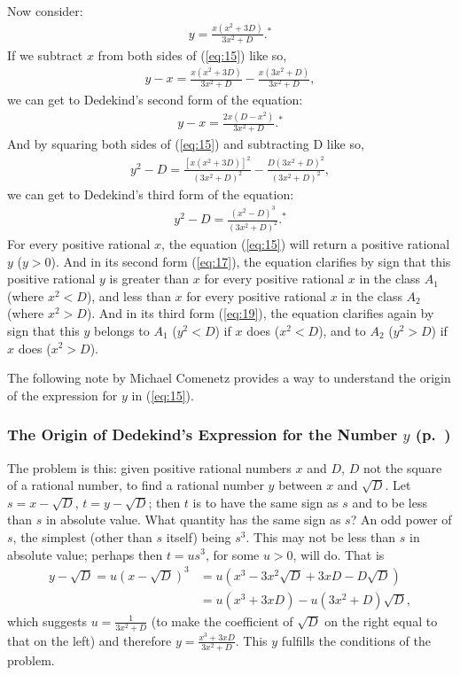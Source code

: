 \documentclass[twoside,openright]{article}
\begin{document}
Now consider:
\begin{align}
  \label{eq:15}
  y=\frac{x(x^2+3D)}{3x^2+D}.^*
\end{align}
If we subtract $x$ from both sides of (\ref{eq:15}) like so,
\begin{align}
  \label{eq:16}
  y-x=\frac{x(x^2+3D)}{3x^2+D}-\frac{x(3x^2+D)}{3x^2+D},
\end{align}
we can get to Dedekind's second form of the equation:
\begin{align}
  \label{eq:17}
  y-x=\frac{2x(D-x^2)}{3x^2+D}.^*
\end{align}
And by squaring both sides of (\ref{eq:15})
and subtracting D like so,
\begin{align}
  \label{eq:18}
  y^2-D=\frac{[x(x^2+3D)]^2}{(3x^2+D)^2}-\frac{D(3x^2+D)^2}{(3x^2+D)^2},
\end{align}
we can get to Dedekind's third form of the equation:
\begin{align}
  \label{eq:19}
  y^2-D=\frac{(x^2-D)^3}{(3x^2+D)^2}.^*
\end{align}
For every positive rational $x$, the equation (\ref{eq:15}) will
return a positive rational $y$ ($y>0$). And in its second form
(\ref{eq:17}), the equation clarifies by sign that this positive
rational $y$ is greater than $x$ for every positive rational $x$ in
the class $A_1$ (where $x^2<D$), and less than $x$ for every positive
rational $x$ in the class $A_2$ (where $x^2>D$). And in its third form
(\ref{eq:19}), the equation clarifies again by sign that this $y$
belongs to $A_1$ ($y^2<D$) if $x$ does ($x^2<D$), and to $A_2$
($y^2>D$) if $x$ does ($x^2>D$).

\medskip{}

\noindent The following note by Michael Comenetz provides a way to
understand the origin of the expression for $y$ in (\ref{eq:15}).

\subsubsection*{The Origin of Dedekind's Expression for the Number $y$ (p.\ \pageref{ypage})}

The problem is this: given positive rational numbers $x$ and $D$, $D$
not the square of a rational number, to find a rational number $y$
between $x$ and $\sqrt{D}$. Let $s=x-\sqrt{D}$, $t=y-\sqrt{D}$; then
$t$ is to have the same sign as $s$ and to be less than $s$ in
absolute value. What quantity has the same sign as $s$? An odd power
of $s$, the simplest (other than $s$ itself) being $s^3$. This may not
be less than $s$ in absolute value; perhaps then $t=us^3$, for some
$u>0$, will do. That is
\begin{align*}
  y-\sqrt{D}=u(x-\sqrt{D})^3&=u(x^3-3x^2\sqrt{D}+3xD-D\sqrt{D})\\
                            &=u(x^3+3xD)-u(3x^2+D)\sqrt{D},
\end{align*}
which suggests $u=\frac{1}{3x^2+D}$ (to make the coefficient of
$\sqrt{D}$ on the right equal to that on the left) and therefore
$y=\frac{x^3+3xD}{3x^2+D}$. This $y$ fulfills the conditions of the
problem.
\end{document}
